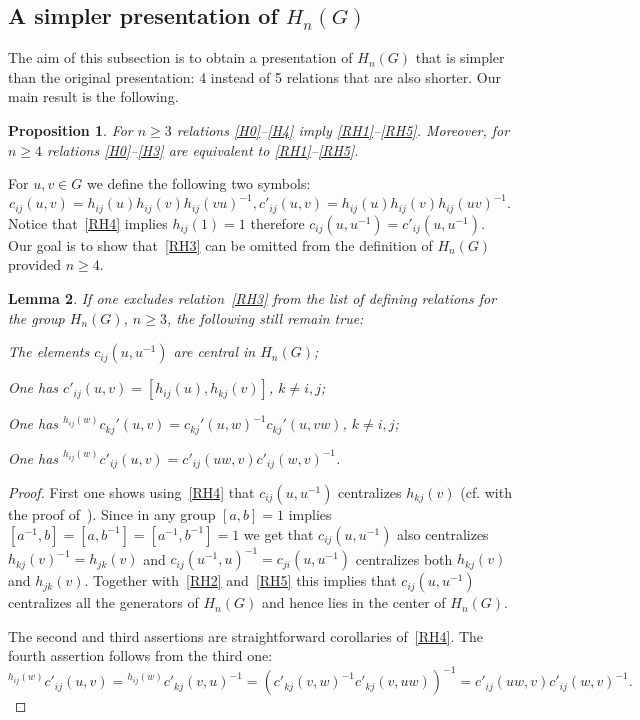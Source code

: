 \documentclass[oneside, 10pt]{amsart}
\theoremstyle{plain}
\numberwithin{equation}{section}
\newtheorem{lemma}{Lemma}
\numberwithin{lemma}{section}
\newtheorem{prop}[lemma]{Proposition}
\theoremstyle{remark}
\theoremstyle{definition}
\begin{document}
\subsection{A simpler presentation of $H_n(G)$}
The aim of this subsection is to obtain a presentation of $H_n(G)$ that is simpler than the original presentation: 4 instead of 5 relations that are also shorter. 
Our main result is the following.
\begin{prop} \label{prop:simpler} 
For $n\geq 3$ relations \eqref{H0}--\eqref{H4} imply \eqref{RH1}--\eqref{RH5}.
Moreover, for $n\geq 4$ relations \eqref{H0}--\eqref{H3} are equivalent to \eqref{RH1}--\eqref{RH5}.
\end{prop}
For $u, v\in G$ we define the following two symbols:
\[c_{ij}(u,v)=h_{ij}(u)h_{ij}(v)h_{ij}(vu)^{-1}, c'_{ij}(u,v)=h_{ij}(u)h_{ij}(v)h_{ij}(uv)^{-1}.\]
Notice that~\eqref{RH4} implies $h_{ij}(1)=1$ therefore $c_{ij}(u, u^{-1}) = c'_{ij}(u, u^{-1})$.
Our goal is to show that~\eqref{RH3} can be omitted from the definition of $H_n(G)$ provided $n \geq 4$.
\begin{lemma} \label{item-lem33} If one excludes relation~\eqref{RH3} from the list of defining relations for the group $H_n(G)$, $n\geq 3$,
 the following still remain true:
 \begin{lemlist}
\item \label{item-lem33-cntr} The elements $c_{ij}(u, u^{-1})$ are central in $H_n(G)$;
\item \label{item-lem33-comm} One has $c'_{ij}(u, v) = [h_{ij}(u), h_{kj}(v)]$, $k\neq i, j$;
\item \label{item-lem33-conj}  One has ${}^{h_{ij}(w)}c_{kj}'(u, v) = c_{kj}'(u, w)^{-1} c_{kj}'(u, vw)$, $k\neq i, j$;
\item \label{item-lem33-conj2} One has ${}^{h_{ij}(w)} c'_{ij}(u, v) = c'_{ij}(uw, v) c'_{ij}(w, v)^{-1}$.
 \end{lemlist}
\end{lemma}
\begin{proof}
First one shows using~\eqref{RH4} that $c_{ij}(u, u^{-1})$ centralizes $h_{kj}(v)$ (cf. with the proof of~\cite[Lemma~2.1(2)]{Reh78}).
Since in any group $[a, b]=1$ implies $[a^{-1}, b] = [a, b^{-1}] = [a^{-1}, b^{-1}] = 1$ we get that $c_{ij}(u, u^{-1})$ also centralizes $h_{kj}(v)^{-1} = h_{jk}(v)$ and
 $c_{ij}(u^{-1}, u)^{-1} = c_{ji}(u, u^{-1})$ centralizes both $h_{kj}(v)$ and $h_{jk}(v)$.
Together with~\eqref{RH2} and~\eqref{RH5} this implies that $c_{ij}(u, u^{-1})$ centralizes all the generators of $H_n(G)$ and hence lies in the center of $H_n(G)$.

The second and third assertions are straightforward corollaries of~\eqref{RH4}.
The fourth assertion follows from the third one:
\[{}^{h_{ij}(w)} c'_{ij}(u, v) = {}^{h_{ij}(w)} c'_{kj}(v, u)^{-1} = (c'_{kj}(v, w)^{-1} c'_{kj}(v, uw))^{-1} = c'_{ij}(uw, v) c'_{ij}(w, v)^{-1}.\]
\end{proof}
\end{document}
